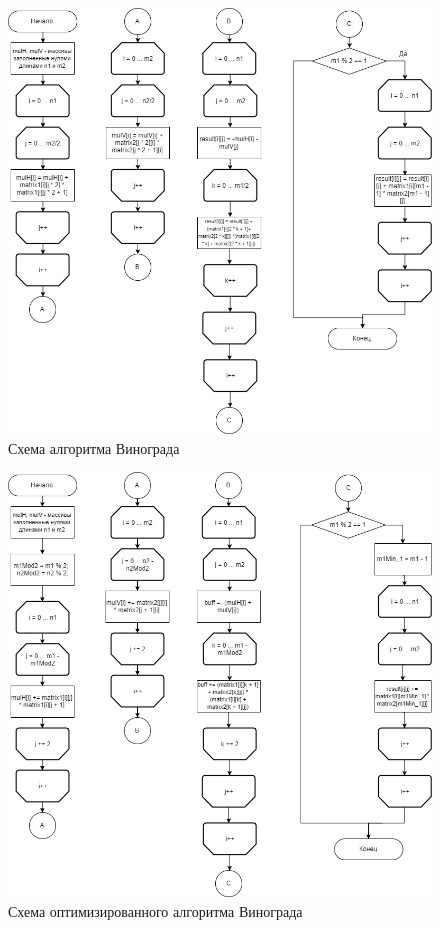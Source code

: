 \documentclass[12pt]{report}
\begin{document}
\begin{figure}[!htbp]
\centering
\includegraphics[scale=0.6]{alg2.jpg}
\caption{Схема алгоритма Винограда}
\label{fig:mpr}
\end{figure}


\begin{figure}[!htbp]
\centering
\includegraphics[scale=0.6]{alg3.jpg}
\caption{Схема оптимизированного алгоритма Винограда}
\label{fig:mpr}
\end{figure}
\end{document}
